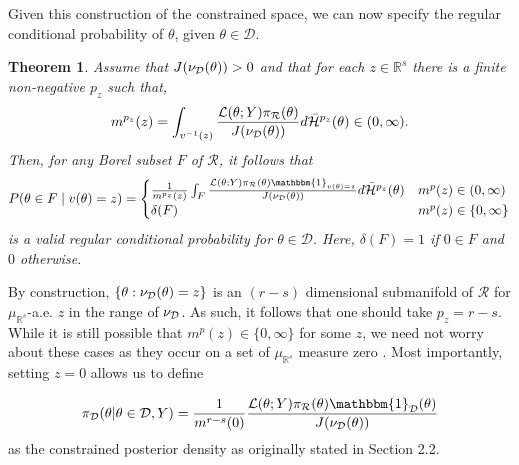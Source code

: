 \documentclass[10pt,fleqn]{article}
\newtheorem{theorem}{Theorem} \newtheorem{lemma}{Lemma}
\DeclareMathOperator{\1}{\mathbbm{1}} \DeclareMathOperator{\bigO}{\mc O}
\begin{document}

Given this construction of the constrained space, we can now specify the regular conditional probability of $\theta$, given $\theta \in
\mathcal{D}.$

\begin{theorem}\citep{diaconis2013manifold}
\label{THM:RCP_construction} Assume that $J(\nu_{\mathcal{D}}(\theta)) > 0$ and
that for each $z\in\mathbb{R}^s$ there is a finite non-negative
$p_z$ such that,  $$m^{p_z}(z) = \int_{v^{-1}(z)}
\frac{\mathcal{L}(\theta; Y) \pi_\mathcal{R}(\theta)}
{J(\nu_{\mathcal{D}}(\theta))}
d\bar{\mathcal{H}}^{p_z}(\theta)
\in (0,\infty).$$
Then, for any Borel subset $F$ of
$\mathcal{R}$, it follows that $$P(\theta \in F \mid v(\theta) = z) = \begin{cases}
\frac{1}{m^{p_z}(z)} \int_{F} \frac{\mathcal{L}(\theta; Y)
\pi_\mathcal{R}(\theta)
\mathbbm{1}_{v(\theta)=z}}{J(\nu_{\mc D}(\theta))}
d\bar{\mathcal{H}}^{p_z}(\theta)
& m^p(z)\in (0,\infty) \\ \delta (F) & m^p(z) \in \{0,\infty\}
\end{cases}$$
is a valid regular conditional probability for
$\theta\in\mathcal{D}.$ Here, $\delta (F)=1$ if $0\in F$ and $0$ otherwise.
\end{theorem}

By construction, $\{\theta:\nu_{\mathcal{D}}(\theta)=z\}$ is an $(r-s)$ dimensional
submanifold of $\mathcal{R}$ for $\mu_{\mathbb{R}^s}$-a.e. $z$ in
the range of $\nu_{\mathcal{D}}$. As such, it follows that one should take $p_z=r-s$. While it is still possible that
$m^p(z)\in\{0,\infty\}$ for some $z$, we need not worry about these cases as they occur on a set of $\mu_{\mathbb{R}^s}$ measure zero . Most importantly, setting $z=0$ allows us to define

\begin{equation} \label{EQ:Constrained_rcp}
\pi_\mathcal{D}(\theta|\theta\in\mathcal{D},Y) = \frac{1}{m^{r-s}({0})}
\frac{\mathcal{L}(\theta; Y) \pi_\mathcal{R}(\theta)
\mathbbm{1}_{\mc D}(\theta)}{J(\nu_{\mc D}(\theta))} \end{equation} as the
constrained posterior density as originally stated in Section 2.2.  
\end{document}

